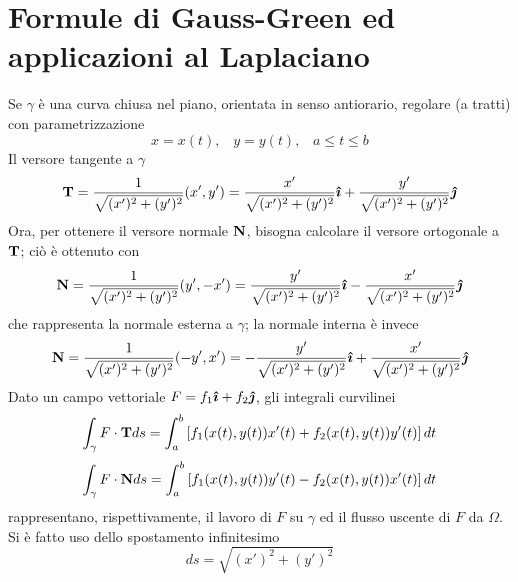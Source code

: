 \section{Formule di Gauss-Green ed applicazioni al Laplaciano}
Se $\gamma$ \`e una curva chiusa nel piano, orientata in senso antiorario,
regolare (a tratti) con parametrizzazione
\[
	x= x(t), \;\;\; y=y(t), \;\;\; a\leq t \leq b
\]
Il versore tangente a $\gamma$
\[
	{\bf T}= \frac{1}{\sqrt{(x')^2+ (y')^2}}(x', y')
	=\frac{x'}{\sqrt{(x')^2+ (y')^2}}\boldsymbol{\hat{\imath}}
	+\frac{y'}{\sqrt{(x')^2+ (y')^2}}\boldsymbol{\hat{\jmath}}
\]
Ora, per ottenere il versore normale ${\bf N}$, bisogna calcolare il versore
ortogonale a ${\bf T}$; ci\`o \`e ottenuto con
\[
	{\bf N}= \frac{1}{\sqrt{(x')^2+ (y')^2}}(y', -x')
	=\frac{y'}{\sqrt{(x')^2+ (y')^2}}\boldsymbol{\hat{\imath}}
	-\frac{x'}{\sqrt{(x')^2+ (y')^2}}\boldsymbol{\hat{\jmath}}
\]
che rappresenta la normale esterna a $\gamma$; la normale interna \`e invece
\[
	{\bf N}= \frac{1}{\sqrt{(x')^2+ (y')^2}}(-y', x')
	=-\frac{y'}{\sqrt{(x')^2+ (y')^2}}\boldsymbol{\hat{\imath}}
	+\frac{x'}{\sqrt{(x')^2+ (y')^2}}\boldsymbol{\hat{\jmath}}
\]
Dato un campo vettoriale $F= f_1 \boldsymbol{\hat{\imath}} + f_2 \boldsymbol{\hat{\jmath}}$, gli integrali curvilinei
\[
	\int_ {\gamma} F \cdot {\bf T} ds=
	\int_a^b \left[ f_1 (x(t), y(t))x'(t)+
	f_2 (x(t), y(t))y'(t)
	\right] dt
\]
\[
	\int_ {\gamma} F \cdot {\bf N} ds=
	\int_a^b \left[ f_1 (x(t), y(t))y'(t)
	- f_2 (x(t), y(t))x'(t)
	\right] dt
\]
rappresentano, rispettivamente, il lavoro di $F$ su $\gamma$ ed il flusso
uscente di $F$ da $\Omega$. Si \`e fatto uso dello spostamento infinitesimo
\[
	ds= \sqrt{(x')^2+(y')^2}
\]

